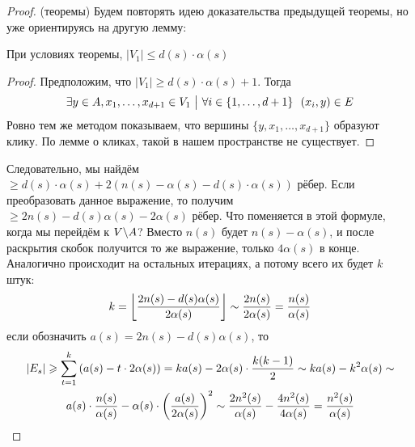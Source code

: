 \begin{proof} (теоремы)
	Будем повторять идею доказательства предыдущей теоремы, но уже ориентируясь на другую лемму:
	\begin{lemma}
		При условиях теоремы, $|V_1| \le d(s) \cdot \alpha(s)$
	\end{lemma}

	\begin{proof}
		Предположим, что $|V_1| \ge d(s) \cdot \alpha(s) + 1$. Тогда
		\[
			\exists y \in A, x_1, \ldots, x_{d + 1} \in V_1 \ \big|\  \forall i \in \{1, \ldots, d + 1\}\ \ (x_i, y) \in E
		\]
		Ровно тем же методом показываем, что вершины $\{y, x_1, \ldots, x_{d + 1}\}$ образуют клику. По лемме о кликах, такой в нашем пространстве не существует.
	\end{proof}
	
	Следовательно, мы найдём $\ge d(s) \cdot \alpha(s) + 2(n(s) - \alpha(s) - d(s) \cdot \alpha(s))$ рёбер. Если преобразовать данное выражение, то получим $\ge 2n(s) - d(s)\alpha(s) - 2\alpha(s)$ рёбер. Что поменяется в этой формуле, когда мы перейдём к $V \backslash A$? Вместо $n(s)$ будет $n(s) - \alpha(s)$, и после раскрытия скобок получится то же выражение, только $4\alpha(s)$ в конце. Аналогично происходит на остальных итерациях, а потому всего их будет $k$ штук:
	\[
		k = \left\lfloor \frac{2n(s) - d(s)\alpha(s)}{2\alpha(s)} \right\rfloor \sim \frac{2n(s)}{2\alpha(s)} = \frac{n(s)}{\alpha(s)}
	\]
	если обозначить $a(s) = 2n(s) - d(s)\alpha(s)$, то
	\begin{multline*}
		|E_s| \geqslant \sum_{t = 1}^k \left(a(s) - t \cdot 2\alpha(s)\right) = ka(s) - 2\alpha(s) \cdot \frac{k(k - 1)}{2} \sim ka(s) - k^2\alpha(s) \sim
		\\
		a(s) \cdot \frac{n(s)}{\alpha(s)} - \alpha(s) \cdot \left(\frac{a(s)}{2\alpha(s)}\right)^2 \sim \frac{2n^2(s)}{\alpha(s)} - \frac{4n^2(s)}{4\alpha(s)} = \frac{n^2(s)}{\alpha(s)}
	\end{multline*}
\end{proof}

